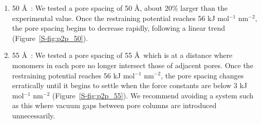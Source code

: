 \begin{enumerate}
	\item 50 \AA~: We tested a pore spacing of 50 \AA, about 20\%
	larger than the experimental value. Once the restraining potential reaches 56
	kJ mol$^{-1}$ nm$^{-2}$, the pore spacing begins to decrease rapidly, following
	a linear trend (Figure~\ref{S-fig:p2p_50}).
                
	\item 55 \AA~: We tested a pore spacing of 55 \AA~which is at
	a distance where monomers in each pore no longer intersect those of adjacent pores. Once
	the restraining potential reaches 56 kJ mol$^{-1}$ nm$^{-2}$, the pore spacing
	changes erratically until it begins to settle when the force constants are
	below 3 kJ mol$^{-1}$ nm$^{-2}$ (Figure~\ref{S-fig:p2p_55}). We recommend
	avoiding a system such as this where vacuum gaps between pore columns are
	introduced unnecessarily. 

	\end{enumerate} 

